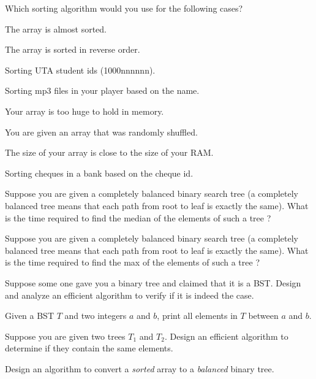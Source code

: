 \documentclass[addpoints,12pt]{exam}
\begin{document}
Which sorting algorithm would you use for the following cases?
\begin{questions}
\qformat{[S\thequestion]}

\question
The array is almost sorted.

\question
The array is sorted in reverse order.

\question
Sorting UTA student ids (1000nnnnnn).

\question
Sorting mp3 files in your player based on the name. 

\question
Your array is too huge to hold in memory.

\question
You are given an array that was randomly shuffled. 

\question
The size of your array is close to the size of your RAM.

\question
Sorting cheques in a bank based on the cheque id.

\end{questions}


\begin{questions}
\qformat{[G\thequestion]}
\question
Suppose you are given a completely balanced binary search tree (a completely balanced tree 
means that each path from root to leaf is exactly the same). What is the time required to find the median
of the elements of such a tree ?

\question
Suppose you are given a completely balanced binary search tree (a completely balanced tree 
means that each path from root to leaf is exactly the same). What is the time required to find the max 
of the elements of such a tree ?

\question
Suppose some one gave you a binary tree and claimed that it is a BST. 
Design and analyze an efficient algorithm to verify if it is indeed the case.

\question
Given a BST $T$ and two integers $a$ and $b$, print all elements in $T$ between $a$ and $b$.

\question
Suppose you are given two trees $T_1$ and $T_2$. Design an efficient algorithm to determine if they contain the same elements.

\question
Design an algorithm to convert a {\em sorted} array to a {\em balanced} binary tree.

\end{questions}
\end{document}

